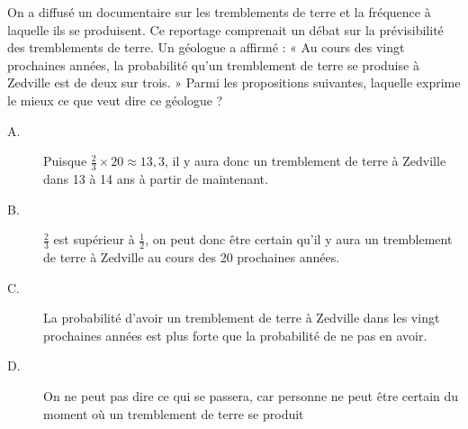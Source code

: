 
On a diffusé un documentaire sur les tremblements de terre et la fréquence à laquelle ils se 
produisent. Ce reportage comprenait un débat sur la prévisibilité des tremblements de terre. 
Un géologue a affirmé : « Au cours des vingt prochaines années, la probabilité qu’un 
tremblement de terre se produise à Zedville est de deux sur trois. »
Parmi les propositions suivantes, laquelle exprime le mieux ce que veut dire ce géologue ?

\begin{description}
\item[A.] Puisque  $\frac{2}{3} \times 20 \approx 13,3$, il y aura donc un tremblement de terre à Zedville dans 13 à 14  
ans à partir de maintenant.
\item[B.] $\frac{2}{3}$  est supérieur à  $\frac{1}{2}$, on peut donc être certain qu’il y aura un tremblement de terre  
à Zedville au cours des 20 prochaines années. 
\item[C.] La probabilité d’avoir un tremblement de terre à Zedville dans les vingt prochaines  
années est plus forte que la probabilité de ne pas en avoir.
\item[D.] On ne peut pas dire ce qui se passera, car personne ne peut être certain du moment 
où un tremblement de terre se produit
\end{description}

